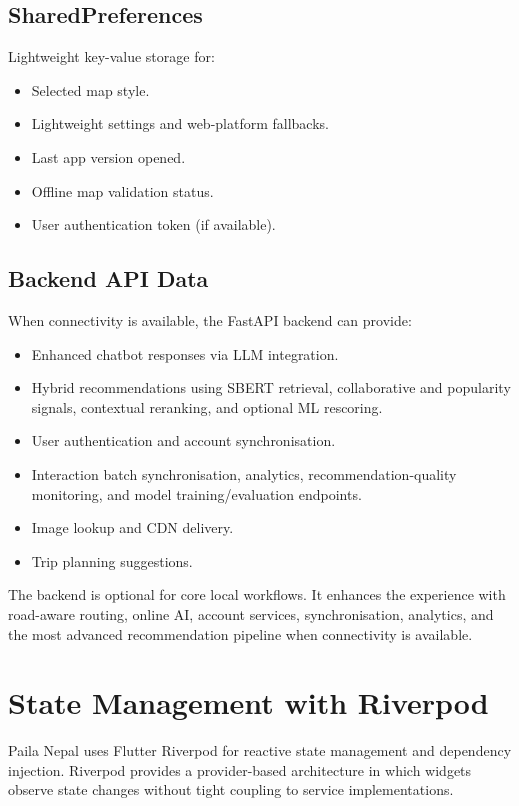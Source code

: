 \documentclass[12pt,a4paper,oneside]{report}
\begin{document}
\subsection{SharedPreferences}

Lightweight key-value storage for:

\begin{itemize}
\item Selected map style.
\item Lightweight settings and web-platform fallbacks.
\item Last app version opened.
\item Offline map validation status.
\item User authentication token (if available).
\end{itemize}

\subsection{Backend API Data}

When connectivity is available, the FastAPI backend can provide:

\begin{itemize}
\item Enhanced chatbot responses via LLM integration.
\item Hybrid recommendations using SBERT retrieval, collaborative and popularity signals, contextual reranking, and optional ML rescoring.
\item User authentication and account synchronisation.
\item Interaction batch synchronisation, analytics, recommendation-quality monitoring, and model training/evaluation endpoints.
\item Image lookup and CDN delivery.
\item Trip planning suggestions.
\end{itemize}

The backend is optional for core local workflows. It enhances the experience with road-aware routing, online AI, account services, synchronisation, analytics, and the most advanced recommendation pipeline when connectivity is available.

\section{State Management with Riverpod}
\label{sec:state_mgmt}

Paila Nepal uses Flutter Riverpod for reactive state management and dependency injection. Riverpod provides a provider-based architecture in which widgets observe state changes without tight coupling to service implementations.
\end{document}
